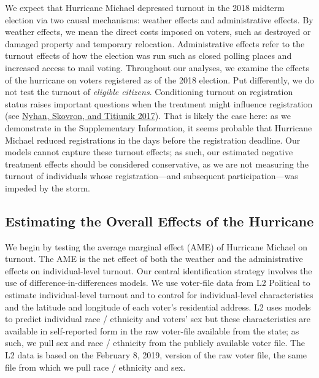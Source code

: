 \documentclass[
  12pt,
]{article}
\begin{document}
We expect that Hurricane Michael depressed turnout in the 2018 midterm election via two causal mechanisms: weather effects and administrative effects. By weather effects, we mean the direct costs imposed on voters, such as destroyed or damaged property and temporary relocation. Administrative effects refer to the turnout effects of how the election was run such as closed polling places and increased access to mail voting. Throughout our analyses, we examine the effects of the hurricane on voters registered as of the 2018 election. Put differently, we do not test the turnout of \emph{eligible citizens}. Conditioning turnout on registration status raises important questions when the treatment might influence registration (see \protect\hyperlink{ref-Nyhan2017}{Nyhan, Skovron, and Titiunik 2017}). That is likely the case here: as we demonstrate in the Supplementary Information, it seems probable that Hurricane Michael reduced registrations in the days before the registration deadline. Our models cannot capture these turnout effects; as such, our estimated negative treatment effects should be considered conservative, as we are not measuring the turnout of individuals whose registration---and subsequent participation---was impeded by the storm.

\hypertarget{estimating-the-overall-effects-of-the-hurricane}{%
\subsection*{Estimating the Overall Effects of the Hurricane}\label{estimating-the-overall-effects-of-the-hurricane}}

We begin by testing the average marginal effect (AME) of Hurricane Michael on turnout. The AME is the net effect of both the weather and the administrative effects on individual-level turnout. Our central identification strategy involves the use of difference-in-differences models. We use voter-file data from L2 Political to estimate individual-level turnout and to control for individual-level characteristics and the latitude and longitude of each voter's residential address. L2 uses models to predict individual race / ethnicity and voters' sex but these characteristics are available in self-reported form in the raw voter-file available from the state; as such, we pull sex and race / ethnicity from the publicly available voter file. The L2 data is based on the February 8, 2019, version of the raw voter file, the same file from which we pull race / ethnicity and sex.
\end{document}
